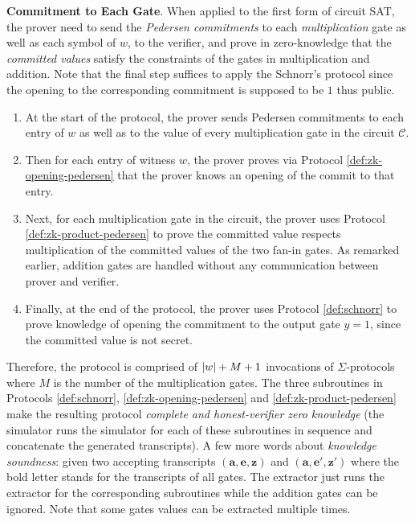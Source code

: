 \documentclass{article}
\begin{document}
\textbf{Commitment to Each Gate}. When applied to the first form of circuit SAT, the prover need to send the \textit{Pedersen commitments} to each \textit{multiplication} gate as well as each symbol of $w$, to the verifier, and prove in zero-knowledge that the \textit{committed values} satisfy the constraints of the gates in multiplication and addition. Note that the final step suffices to apply the Schnorr's protocol since the opening to the corresponding commitment is supposed to be $1$ thus public. 
\begin{enumerate}
\item\label{item:58} At the start of the protocol, the prover sends Pedersen commitments to each entry of $w$ as well as to the value of every multiplication gate in the circuit $\mathcal{C}$.  
\item\label{item:67} Then for each entry of witness $w$, the prover proves via Protocol \ref{def:zk-opening-pedersen} that the prover knows an opening of the commit to that entry. 
\item\label{item:68} Next, for each multiplication gate in the circuit, the prover uses Protocol \ref{def:zk-product-pedersen} to prove the committed value respects multiplication of the committed values of the two fan-in gates. As remarked earlier, addition gates are handled without any communication between prover and verifier. 
\item\label{item:69} Finally, at the end of the protocol, the prover uses Protocol \ref{def:schnorr} to prove knowledge of opening the commitment to the output gate $y = 1$, since the committed value is not secret.
\end{enumerate}

Therefore, the protocol is comprised of $\abs{w} + M + 1$ invocations of $\Sigma$-protocols where $M$ is the number of the multiplication gates. The three subroutines in Protocols \ref{def:schnorr}, \ref{def:zk-opening-pedersen} and \ref{def:zk-product-pedersen} make the resulting protocol \textit{complete and honest-verifier zero knowledge} (the simulator runs the simulator for each of these subroutines in sequence and concatenate the generated transcripts). A few more words about \textit{knowledge soundness}: given two accepting transcripts $(\mathbf{a}, \mathbf{e}, \mathbf{z})$ and $(\mathbf{a}, \mathbf{e'}, \mathbf{z'})$ where the bold letter stands for the transcripts of all gates. The extractor just runs the extractor for the corresponding subroutines while the addition gates can be ignored. Note that some gates values can be extracted multiple times. 
\end{document}
